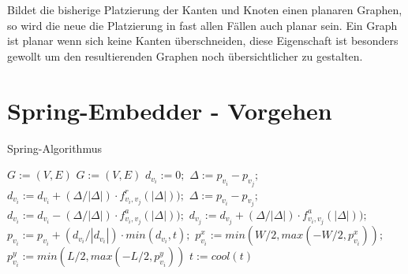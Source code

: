 Bildet die bisherige 
Platzierung der Kanten und Knoten einen planaren Graphen, so wird die neue die Platzierung in fast allen Fällen
auch planar sein. Ein Graph ist planar wenn sich keine Kanten überschneiden, diese Eigenschaft ist besonders gewollt um den resultierenden Graphen noch übersichtlicher zu gestalten.





\section{Spring-Embedder - Vorgehen}
\label{Kapitel_3_-_Unterkapitel_2}
%

\begin{algorithm}[t]
	\centering
	\caption[Ein Algorithmus]{Spring-Algorithmus} \label{algo_1}
	\begin{algorithmic}
		\REQUIRE \begin{math} G:= (V,E) \end{math}
		\ENSURE \begin{math} G:= (V,E) \end{math}
		\STATE $d_{v_{i}} := 0;$
		\STATE $\Delta := p_{v_{i}} - p_{v_{j}};$
		\STATE $d_{v_{i}} := d_{v_{i}} + (\Delta / |\Delta|) \cdot f^{r}_{v_{i},v_{j}}(|\Delta|));$
		\ENDIF
		\ENDFOR
		\ENDFOR
		\newline
		\STATE $\Delta := p_{v_{i}} - p_{v_{j}};$
		\STATE $d_{v_{i}} := d_{v_{i}} - (\Delta / |\Delta|) \cdot f^{a}_{v_{i},v_{j}}(|\Delta|));$
		\STATE $d_{v_{j}} := d_{v_{j}} + (\Delta / |\Delta|) \cdot f^{a}_{v_{i},v_{j}}(|\Delta|));$
		\ENDFOR
		\newline
		\STATE $p_{v_{i}} := p_{v_{i}} + ( d_{v_{i}}/ |d_{v_{i}}|) \cdot min ( d_{v_{i}}, t );$
		\STATE $p_{v_{i}}^{x} := min(W/2, max(-W/2, p_{v_{i}}^{x}));$
		\STATE $p_{v_{i}}^{y} := min(L/2, max(-L/2, p_{v_{i}}^{y}))$
		\ENDFOR
		\STATE $t:= cool(t)$
		\ENDFOR
	\end{algorithmic}
\end{algorithm}

